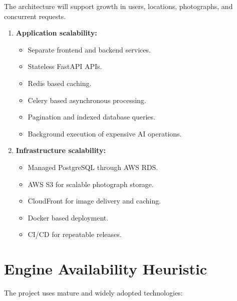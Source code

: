 \documentclass[11pt,a4paper]{article}
\begin{document}
The architecture will support growth in users, locations, photographs, and
concurrent requests.

\begin{enumerate}[leftmargin=0.7cm]
    \item \textbf{Application scalability:}
    \begin{itemize}[leftmargin=0.7cm]
        \item Separate frontend and backend services.
        \item Stateless FastAPI APIs.
        \item Redis based caching.
        \item Celery based asynchronous processing.
        \item Pagination and indexed database queries.
        \item Background execution of expensive AI operations.
    \end{itemize}

    \item \textbf{Infrastructure scalability:}
    \begin{itemize}[leftmargin=0.7cm]
        \item Managed PostgreSQL through AWS RDS.
        \item AWS S3 for scalable photograph storage.
        \item CloudFront for image delivery and caching.
        \item Docker based deployment.
        \item CI/CD for repeatable releases.
    \end{itemize}
\end{enumerate}

\section{Engine Availability Heuristic}

The project uses mature and widely adopted technologies:
\end{document}
